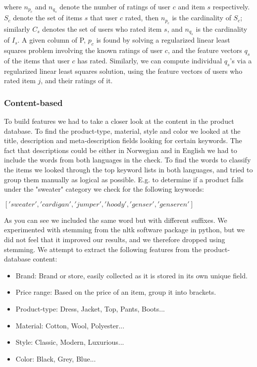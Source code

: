 where $n_{p_{c}}$ and $n_{q_{s}}$ denote the number of ratings of user $c$ and item $s$ respectively. $S_{c}$ denote the set of items $s$ that user $c$ rated, then $n_{p_{c}}$ is the cardinality of $S_{c}$; similarly $C_{s}$ denotes the set of users who rated item $s$, and $n_{q_{s}}$ is the cardinality of $I_{s}$. A given column of P, $p_{c}$ is found by solving a regularized linear least squares problem involving the known ratings of user $c$, and the feature vectors $q_{s}$ of the items that user $c$ has rated. Similarly, we can compute individual $q_{s}$'s via a regularized linear least squares solution, using the feature vectors of users who rated item $j$, and their ratings of it.

\subsubsection{Content-based}

To build features we had to take a closer look at the content in the product database. To find the product-type, material, style and color we looked at the title, description and meta-description fields looking for certain keywords. The fact that descriptions could be either in Norwegian and in English we had to include the words from both languages in the check. To find the words to classify the items we looked through the top keyword lists in both languages, and tried to group them manually as logical as possible. E.g. to determine if a product falls under the "sweater" category we check for the following keywords:

$['sweater','cardigan','jumper','hoody','genser','genseren']$

As you can see we included the same word but with different suffixes. We experimented with stemming from the nltk software package in python, but we did not feel that it improved
our results, and we therefore dropped using stemming. We attempt to extract the following features from the product-database content:

\begin{itemize}

\item Brand: Brand or store, easily collected as it is stored in its own unique field.
\item Price range: Based on the price of an item, group it into brackets.
\item Product-type: Dress, Jacket, Top, Pants, Boots...

\item Material: Cotton, Wool, Polyester...
\item Style: Classic, Modern, Luxurious...
\item Color: Black, Grey, Blue...
\end{itemize}

